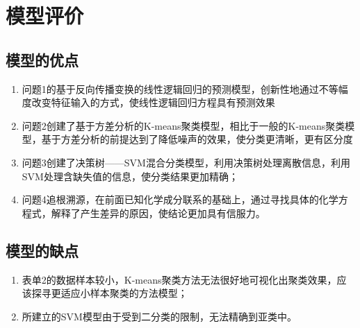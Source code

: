\documentclass[withoutpreface,bwprint]{cumcmthesis} %
\begin{document}
\section{模型评价}
\subsection{模型的优点}
\begin{enumerate}
	\item 问题1的基于反向传播变换的线性逻辑回归的预测模型，创新性地通过不等幅度改变特征输入的方式，使线性逻辑回归方程具有预测效果
	\item 问题2创建了基于方差分析的K-means聚类模型，相比于一般的K-means聚类模型，基于方差分析的前提达到了降低噪声的效果，使分类更清晰，更有区分度
	\item 问题3创建了决策树——SVM混合分类模型，利用决策树处理离散信息，利用SVM处理含缺失值的信息，使分类结果更加精确；
	\item 问题4追根溯源，在前面已知化学成分联系的基础上，通过寻找具体的化学方程式，解释了产生差异的原因，使结论更加具有信服力。
\end{enumerate}

\subsection{模型的缺点}

\begin{enumerate}
	\item 表单2的数据样本较小，K-means聚类方法无法很好地可视化出聚类效果，应该探寻更适应小样本聚类的方法模型；
	\item 所建立的SVM模型由于受到二分类的限制，无法精确到亚类中。
\end{enumerate}


\newpage

\renewcommand{\notesname}{参考文献} 
\theendnotes
\end{document}
